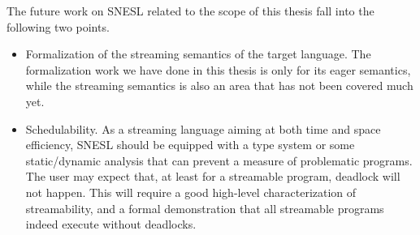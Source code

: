 The future work on SNESL related to the scope of this thesis fall into the following two points.
\begin{itemize}
		\item Formalization of the streaming semantics of the target language. 
		The formalization work we have done in this thesis is only for its eager semantics, while the streaming semantics is also an area that has not been covered much yet.
		
	\item Schedulability.  As a streaming language aiming at both time and space efficiency,  SNESL should be equipped with a type system or some static/dynamic analysis that can prevent a measure of problematic programs. The user may expect that, at least for a streamable program, deadlock will not happen. This will require a good high-level characterization of streamability, and a formal demonstration that all streamable programs indeed execute without deadlocks.
	

\end{itemize}

